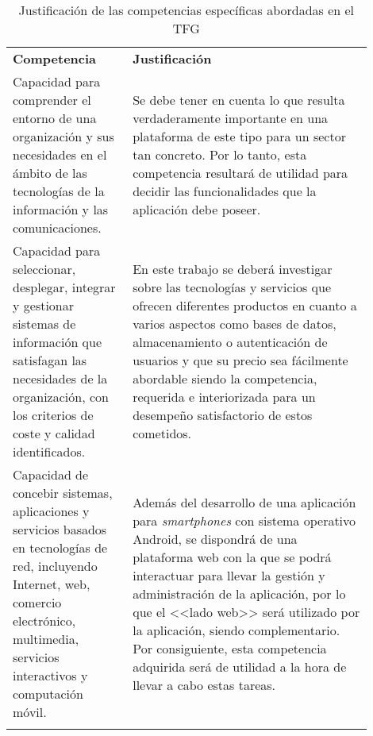 \documentclass{pre-tfg}
\begin{document}
\begin{table}[hp]
	\centering
	\caption{Justificación de las competencias específicas abordadas en el TFG}
	\label{tab:competencias}
	
	\begin{tabular}{p{0.3\linewidth}p{0.6\linewidth}}
		\textbf{Competencia} & \textbf{Justificación} \\
		
			Capacidad para comprender el entorno de una organización y sus necesidades en el
			ámbito de las tecnologías de la información y las comunicaciones.
			&
			Se debe tener en cuenta lo que resulta verdaderamente importante en una plataforma de este tipo para un sector tan concreto. Por lo tanto, esta competencia resultará de utilidad para decidir las funcionalidades que la aplicación debe poseer. \\
			
			Capacidad para seleccionar, desplegar, integrar y gestionar sistemas de información
			que satisfagan las necesidades de la organización, con los criterios de coste y calidad
			identificados.
			&
			En este trabajo se deberá investigar sobre las tecnologías y servicios que ofrecen diferentes productos en cuanto a varios aspectos como bases de datos, almacenamiento o autenticación de usuarios y que su precio sea fácilmente abordable siendo la competencia, requerida e interiorizada para un desempeño satisfactorio de estos cometidos. \\
			
			Capacidad de concebir sistemas, aplicaciones y servicios basados en tecnologías de
			red, incluyendo Internet, web, comercio electrónico, multimedia, servicios interactivos
			y computación móvil.
			& 
			Además del desarrollo de una aplicación para \textit{smartphones} con sistema operativo Android, se dispondrá de una plataforma web con la que se podrá interactuar para llevar la gestión y administración de la aplicación, por lo que el <<lado web>> será utilizado por la aplicación, siendo complementario. Por consiguiente, esta competencia adquirida será de utilidad a la hora de llevar a cabo estas tareas.\\
			& 
			\\
			
	\end{tabular}

\end{table}
\end{document}

